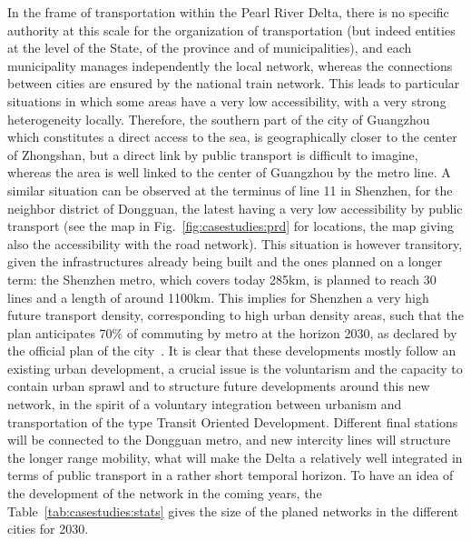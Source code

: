 \documentclass[11pt]{article}
\begin{document}
In the frame of transportation within the Pearl River Delta, there is no specific authority at this scale for the organization of transportation (but indeed entities at the level of the State, of the province and of municipalities), and each municipality manages independently the local network, whereas the connections between cities are ensured by the national train network. This leads to particular situations in which some areas have a very low accessibility, with a very strong heterogeneity locally. Therefore, the southern part of the city of Guangzhou which constitutes a direct access to the sea, is geographically closer to the center of Zhongshan, but a direct link by public transport is difficult to imagine, whereas the area is well linked to the center of Guangzhou by the metro line. A similar situation can be observed at the terminus of line 11 in Shenzhen, for the neighbor district of Dongguan, the latest having a very low accessibility by public transport (see the map in Fig.~\ref{fig:casestudies:prd} for locations, the map giving also the accessibility with the road network). This situation is however transitory, given the infrastructures already being built and the ones planned on a longer term: the Shenzhen metro, which covers today 285km, is planned to reach 30 lines and a length of around 1100km. This implies for Shenzhen a very high future transport density, corresponding to high urban density areas, such that the plan anticipates 70\% of commuting by metro at the horizon 2030, as declared by the official plan of the city~\citep{shenzhen2016plan}. It is clear that these developments mostly follow an existing urban development, a crucial issue is the voluntarism and the capacity to contain urban sprawl and to structure future developments around this new network, in the spirit of a voluntary integration between urbanism and transportation of the type Transit Oriented Development. Different final stations will be connected to the Dongguan metro, and new intercity lines will structure the longer range mobility, what will make the Delta a relatively well integrated in terms of public transport in a rather short temporal horizon. To have an idea of the development of the network in the coming years, the Table~\ref{tab:casestudies:stats} gives the size of the planed networks in the different cities for 2030.

\end{document}
